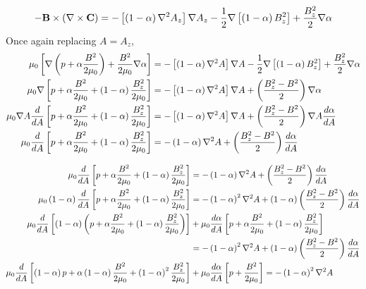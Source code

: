 \begin{equation}
    -\mathbf{B}\times\left( \nabla \times\mathbf{C} \right) = -\left[ \left( 1-\alpha \right)\nabla^2 A_z \right] \nabla A_z - \frac{1}{2}\nabla\left[ \left( 1-\alpha \right)B_z^2 \right] + \frac{B_z^2}{2}\nabla\alpha
\end{equation}
Once again replacing $A=A_z$,
\[\begin{split}
    \mu_0\left[ \nabla\left( p + \alpha\frac{B^2}{2\mu_0} \right) + \frac{B^2}{2\mu_0}\nabla\alpha \right]  &= -\left[ \left( 1-\alpha \right)\nabla^2 A \right] \nabla A - \frac{1}{2}\nabla\left[ \left( 1-\alpha \right)B_z^2 \right] + \frac{B_z^2}{2}\nabla\alpha \\
    \mu_0\nabla\left[ p + \alpha\frac{B^2}{2\mu_0} + \left( 1-\alpha \right)\frac{B_z^2}{2\mu_0} \right] &= -\left[ \left( 1-\alpha \right)\nabla^2 A \right]\nabla A + \left( \frac{B_z^2-B^2}{2} \right)\nabla\alpha \\
    \mu_0\nabla A\frac{d}{dA}\left[ p + \alpha\frac{B^2}{2\mu_0} + \left( 1-\alpha \right)\frac{B_z^2}{2\mu_0} \right] &= -\left[ \left( 1-\alpha \right)\nabla^2 A \right]\nabla A + \left( \frac{B_z^2-B^2}{2} \right)\nabla A \frac{d\alpha}{d A} \\
    \mu_0\frac{d}{d A}\left[ p + \alpha\frac{B^2}{2\mu_0} + \left( 1-\alpha \right)\frac{B_z^2}{2\mu_0} \right] &= -\left( 1-\alpha \right)\nabla^2 A + \left( \frac{B_z^2-B^2}{2} \right)\frac{d\alpha}{dA} \\
\end{split}\]

\[\begin{split}
    \mu_0\frac{d}{d A}\left[ p + \alpha\frac{B^2}{2\mu_0} + \left( 1-\alpha \right)\frac{B_z^2}{2\mu_0} \right] &= -\left( 1-\alpha \right)\nabla^2 A + \left( \frac{B_z^2-B^2}{2} \right)\frac{d\alpha}{dA} \\
    \mu_0\left( 1-\alpha \right)\frac{d}{d A}\left[ p + \alpha\frac{B^2}{2\mu_0} + \left( 1-\alpha \right)\frac{B_z^2}{2\mu_0} \right] &= -\left( 1-\alpha \right)^2\nabla^2 A + \left( 1-\alpha \right)\left( \frac{B_z^2-B^2}{2} \right)\frac{d\alpha}{dA} \\
    \mu_0\frac{d}{d A}\left[ \left( 1-\alpha \right)\left( p + \alpha\frac{B^2}{2\mu_0} + \left( 1-\alpha \right)\frac{B_z^2}{2\mu_0} \right) \right] &+ \mu_0\frac{d\alpha}{dA}\left[ p + \alpha\frac{B^2}{2\mu_0} + \left( 1-\alpha \right)\frac{B_z^2}{2\mu_0} \right] \\
    &= -\left( 1-\alpha \right)^2\nabla^2 A + \left( 1-\alpha \right)\left( \frac{B_z^2-B^2}{2} \right)\frac{d\alpha}{dA} \\
    \mu_0\frac{d}{d A}\left[ \left( 1-\alpha \right)p + \alpha\left( 1-\alpha \right)\frac{B^2}{2\mu_0} + \left( 1-\alpha \right)^2\frac{B_z^2}{2\mu_0} \right] &+ \mu_0\frac{d\alpha}{dA}\left[ p + \frac{B^2}{2\mu_0} \right] = -\left( 1-\alpha \right)^2\nabla^2 A\\
\end{split}
\]

